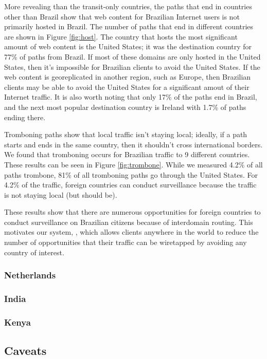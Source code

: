 More revealing than the transit-only countries, the paths that end in countries other than Brazil show that web content for Brazilian Internet users is not primarily hosted in Brazil.  The number of paths that end in different countries are shown in Figure \ref{fig:host}.  The country that hosts the most significant amount of web content is the United States; it was the destination country for 77\% of paths from Brazil.  If most of these domains are only hosted in the United States, then it's impossible for Brazilian clients to avoid the United States.  If the web content is georeplicated in another region, such as Europe, then Brazilian clients may be able to avoid the United States for a significant amout of their Internet traffic.  It is also worth noting that only 17\% of the paths end in Brazil, and the next most popular destination country is Ireland with 1.7\% of paths ending there.  

Tromboning paths show that local traffic isn't staying local; ideally, if a path starts and ends in the same country, then it shouldn't cross international borders.  We found that tromboning occurs for Brazilian traffic to 9 different countries.  These results can be seen in Figure \ref{fig:trombone}.  While we measured 4.2\% of all paths trombone, 81\% of all tromboning paths go through the United States.  For 4.2\% of the traffic, foreign countries can conduct surveillance because the traffic is not staying local (but should be). 



These results show that there are numerous opportunities for foreign countries to conduct surveillance on Brazilian citizens because of interdomain routing.  This motivates our system, \system{}, which allows clients anywhere in the world to reduce the number of opportunities that their traffic can be wiretapped by avoiding any country of interest.  

\subsubsection{Netherlands}

\subsubsection{India}

\subsubsection{Kenya}

\subsection{Caveats}

